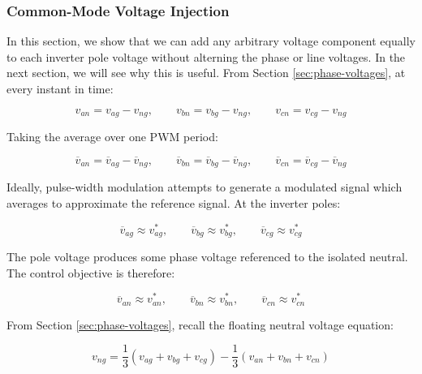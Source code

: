 \documentclass{article}
\begin{document}
\subsubsection{Common-Mode Voltage Injection}
\label{sec:common-mode-voltage-injection}

In this section, we show that we can add any arbitrary voltage component equally to each inverter pole voltage without alterning the phase or line voltages. In the next section, we will see why this is useful. From Section \ref{sec:phase-voltages}, at every instant in time:

\begin{equation}
    v_{an} = v_{ag} - v_{ng}, \qquad
    v_{bn} = v_{bg} - v_{ng}, \qquad
    v_{cn} = v_{cg} - v_{ng}
\end{equation}

Taking the average over one PWM period:

\begin{equation}
    \overline{v}_{an} = \overline{v}_{ag} - \overline{v}_{ng}, \qquad
    \overline{v}_{bn} = \overline{v}_{bg} - \overline{v}_{ng}, \qquad
    \overline{v}_{cn} = \overline{v}_{cg} - \overline{v}_{ng}
\end{equation}

Ideally, pulse-width modulation attempts to generate a modulated signal which averages to approximate the reference signal. At the inverter poles:

\begin{equation}
    \overline{v}_{ag} \approx v_{ag}^*, \qquad
    \overline{v}_{bg} \approx v_{bg}^*, \qquad
    \overline{v}_{cg} \approx v_{cg}^*
\end{equation}

The pole voltage produces some phase voltage referenced to the isolated neutral. The control objective is therefore:

\begin{equation}
    \overline{v}_{an} \approx v_{an}^*, \qquad
    \overline{v}_{bn} \approx v_{bn}^*, \qquad
    \overline{v}_{cn} \approx v_{cn}^*
\end{equation}

From Section \ref{sec:phase-voltages}, recall the floating neutral voltage equation:

\begin{equation}
    v_{ng} = \frac{1}{3}(v_{ag} + v_{bg} + v_{cg}) - \frac{1}{3}(v_{an} + v_{bn} + v_{cn}) 
\end{equation}
\end{document}
